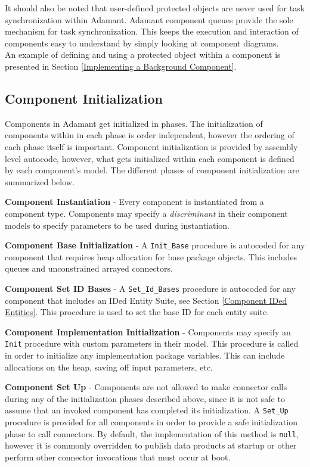 It should also be noted that user-defined protected objects are never used for task synchronization within Adamant. Adamant component queues provide the sole mechanism for task synchronization. This keeps the execution and interaction of components easy to understand by simply looking at component diagrams. \\

An example of defining and using a protected object within a component is presented in Section \ref{Implementing a Background Component}.

\subsection{Component Initialization} \label{Component Initialization}

Components in Adamant get initialized in phases. The initialization of components within in each phase is order independent, however the ordering of each phase itself is important. Component initialization is provided by assembly level autocode, however, what gets initialized within each component is defined by each component's model. The different phases of component initialization are summarized below.

\vspace{5mm} %
\begin{spacedenumerate}
  \item \textbf{Component Instantiation} - Every component is instantiated from a component type. Components may specify a \textit{discriminant} in their component models to specify parameters to be used during instantiation.
  \item \textbf{Component Base Initialization} - A \texttt{Init\_Base} procedure is autocoded for any component that requires heap allocation for base package objects. This includes queues and unconstrained arrayed connectors.
  \item \textbf{Component Set ID Bases} - A \texttt{Set\_Id\_Bases} procedure is autocoded for any component that includes an IDed Entity Suite, see Section \ref{Component IDed Entities}. This procedure is used to set the base ID for each entity suite.
  \item \textbf{Component Implementation Initialization} - Components may specify an \texttt{Init} procedure with custom parameters in their model. This procedure is called in order to initialize any implementation package variables. This can include allocations on the heap, saving off input parameters, etc.
  \item \textbf{Component Set Up} - Components are not allowed to make connector calls during any of the initialization phases described above, since it is not safe to assume that an invoked component has completed its initialization. A \texttt{Set\_Up} procedure is provided for all components in order to provide a safe initialization phase to call connectors. By default, the implementation of this method is \texttt{null}, however it is commonly overridden to publish data products at startup or other perform other connector invocations that must occur at boot.
\end{spacedenumerate}
\vspace{5mm} %

